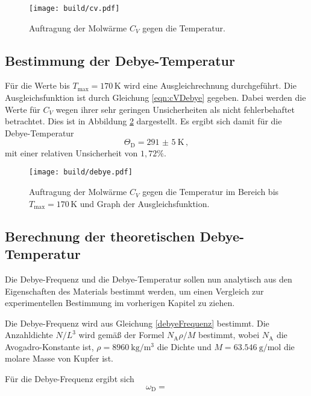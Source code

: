 \begin{figure}
  \centering
  \texttt{[image: build/cv.pdf]}
  \caption{Auftragung der Molwärme $C_V$ gegen die Temperatur.}
  \label{fig:cv}
\end{figure}

\subsection{Bestimmung der Debye-Temperatur}
\label{subsec:debye}

Für die Werte bis $T_{\text{max}}=170$\,K wird eine Ausgleichrechnung durchgeführt. Die Ausgleichsfunktion ist durch Gleichung \eqref{eqn:cVDebye} gegeben.
Dabei werden die Werte für $C_V$ wegen ihrer sehr geringen Unsicherheiten als nicht fehlerbehaftet betrachtet. Dies ist in Abbildung \ref{fig:debye} dargestellt. Es ergibt sich damit für die Debye-Temperatur
\begin{equation*}
  \Theta_\text{D}=\SI{291(5)}{\kelvin} \,,
\end{equation*}
mit einer relativen Unsicherheit von $1{,}72\%$.

\begin{figure}
  \centering
  \texttt{[image: build/debye.pdf]}
  \caption{Auftragung der Molwärme $C_V$ gegen die Temperatur im Bereich bis
  $T_{\text{max}}=170$\,K und Graph der Ausgleichsfunktion.}
  \label{fig:debye}
\end{figure}

\subsection{Berechnung der theoretischen Debye-Temperatur}
\label{subsec:debyetheo}

Die Debye-Frequenz und die Debye-Temperatur sollen nun analytisch aus den Eigenschaften des Materials bestimmt werden, um einen Vergleich zur experimentellen Bestimmung im vorherigen Kapitel zu ziehen.

Die Debye-Frequenz wird aus Gleichung \eqref{debyeFrequenz} bestimmt. Die Anzahldichte $N/L^3$ wird gemäß der Formel $N_\text{A} \rho / M$ bestimmt, wobei $N_\text{A}$ die Avogadro-Konstante ist, $\rho = \SI{8960}{\kilo\gram\per\cubic\meter}$ \cite{density} die Dichte und $M = \SI{63.546}{\gram\per\mole}$ \cite{Molmasse} die molare Masse von Kupfer ist.

Für die Debye-Frequenz ergibt sich
\begin{equation}
  \omega_\text{D} = 
\end{equation}

